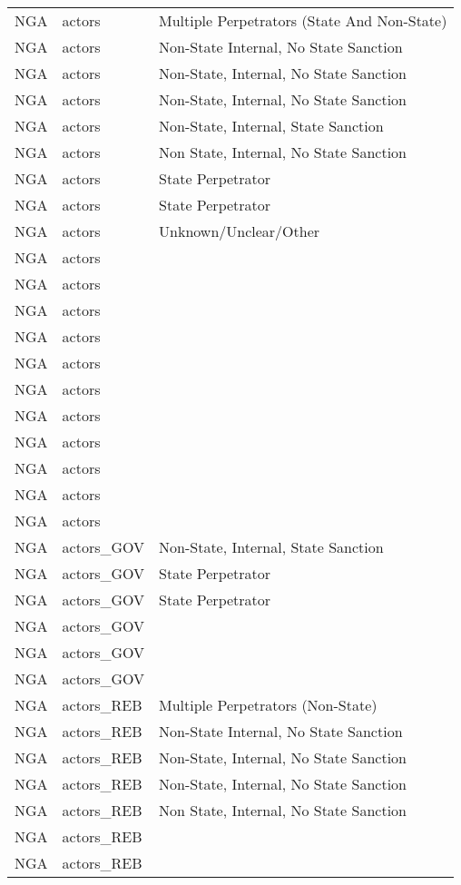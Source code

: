 \begin{table}[ht]
\begin{tabular}{lll}
  NGA & actors & Multiple Perpetrators (State And Non-State) \\ 
  NGA & actors & Non-State Internal, No State Sanction \\ 
  NGA & actors & Non-State, Internal, No State Sanction \\ 
  NGA & actors & Non-State, Internal, No State Sanction \\ 
  NGA & actors & Non-State, Internal, State Sanction \\ 
  NGA & actors & Non State, Internal, No State Sanction \\ 
  NGA & actors & State Perpetrator \\ 
  NGA & actors & State Perpetrator \\ 
  NGA & actors & Unknown/Unclear/Other \\ 
  NGA & actors &  \\ 
  NGA & actors &  \\ 
  NGA & actors &  \\ 
  NGA & actors &  \\ 
  NGA & actors &  \\ 
  NGA & actors &  \\ 
  NGA & actors &  \\ 
  NGA & actors &  \\ 
  NGA & actors &  \\ 
  NGA & actors &  \\ 
  NGA & actors &  \\ 
  NGA & actors\_GOV & Non-State, Internal, State Sanction \\ 
  NGA & actors\_GOV & State Perpetrator \\ 
  NGA & actors\_GOV & State Perpetrator \\ 
  NGA & actors\_GOV &  \\ 
  NGA & actors\_GOV &  \\ 
  NGA & actors\_GOV &  \\ 
  NGA & actors\_REB & Multiple Perpetrators (Non-State) \\ 
  NGA & actors\_REB & Non-State Internal, No State Sanction \\ 
  NGA & actors\_REB & Non-State, Internal, No State Sanction \\ 
  NGA & actors\_REB & Non-State, Internal, No State Sanction \\ 
  NGA & actors\_REB & Non State, Internal, No State Sanction \\ 
  NGA & actors\_REB &  \\ 
  NGA & actors\_REB &  \\ 

\end{tabular}
\end{table}
